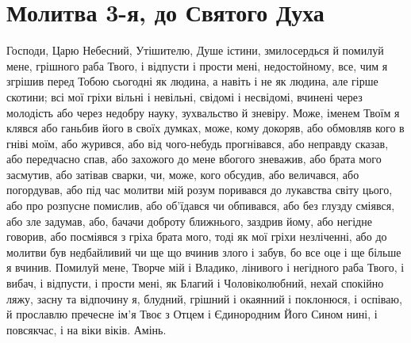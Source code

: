 \documentclass[chapters.tex]{subfiles}
\begin{document}
\section{Молитва 3-я, до Святого Духа}
Господи, Царю Небесний, Утішителю, Душе істини, змилосердься й помилуй мене, грішного раба Твого, і відпусти і прости мені, недостойному, все, чим я згрішив перед Тобою сьогодні як людина, а навіть і не як людина, але гірше скотини; всі мої гріхи вільні і невільні, свідомі і несвідомі, вчинені через молодість або через недобру науку, зухвальство й зневіру. Може, іменем Твоїм я клявся або ганьбив його в своїх думках, може, кому докоряв, або обмовляв кого в гніві моїм, або журився, або від чого-небудь прогнівався, або неправду сказав, або передчасно спав, або захожого до мене вбогого зневажив, або брата мого засмутив, або затівав сварки, чи, може, кого обсудив, або величався, або погордував, або під час молитви мій розум поривався до лукавства світу цього, або про розпусне помислив, або об’їдався чи обпивався, або без глузду сміявся, або зле задумав, або, бачачи доброту ближнього, заздрив йому, або негідне говорив, або посміявся з гріха брата мого, тоді як мої гріхи незліченні, або до молитви був недбайливий чи ще що вчинив злого і забув, бо все оце і ще більше я вчинив. Помилуй мене, Творче мій і Владико, лінивого і негідного раба Твого, і вибач, і відпусти, і прости мені, як Благий і Чоловіколюбний, нехай спокійно ляжу, засну та відпочину я, блудний, грішний і окаянний і поклонюся, і оспіваю, й прославлю пречесне ім’я Твоє з Отцем і Єдинородним Його Сином нині, і повсякчас, і на віки віків. Амінь.
\end{document}
